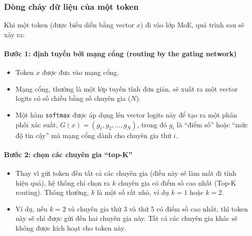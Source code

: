 \begin{center}
    \label{fig:moe_transformer_block}
\end{center}

\subsubsection{Dòng chảy dữ liệu của một token}
Khi một token (được biểu diễn bằng vector $x$) đi vào lớp MoE, quá trình sau sẽ xảy ra:

\paragraph{Bước 1: định tuyến bởi mạng cổng (routing by the gating network)}
\begin{itemize}
    \item Token $x$ được đưa vào mạng cổng.
    \item Mạng cổng, thường là một lớp tuyến tính đơn giản, sẽ xuất ra một vector logits có số chiều bằng số chuyên gia ($N$).
    \item Một hàm \texttt{softmax} được áp dụng lên vector logits này để tạo ra một phân phối xác suất, $G(x) = (g_1, g_2, \dots, g_N)$, trong đó $g_i$ là “điểm số” hoặc “mức độ tin cậy” mà mạng cổng dành cho chuyên gia thứ $i$.
\end{itemize}

\paragraph{Bước 2: chọn các chuyên gia “top-K”}
\begin{itemize}
    \item Thay vì gửi token đến tất cả các chuyên gia (điều này sẽ làm mất đi tính hiệu quả), hệ thống chỉ chọn ra $k$ chuyên gia có điểm số cao nhất (Top-K routing). Thông thường, $k$ là một số rất nhỏ, ví dụ $k=1$ hoặc $k=2$.
    \item Ví dụ, nếu $k=2$ và chuyên gia thứ 3 và thứ 5 có điểm số cao nhất, thì token này sẽ chỉ được gửi đến hai chuyên gia này. Tất cả các chuyên gia khác sẽ không được kích hoạt cho token này.
\end{itemize}

